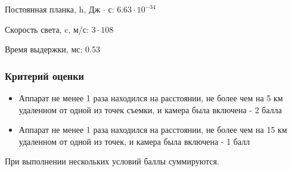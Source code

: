 Постоянная планка, h, Дж $\cdot$ с: $6.63 \cdot 10^{-34}$

Скорость света, c, м/с: $3 \cdot 108$

Время выдержки, мс: 0.53


\subsubsection*{Критерий оценки}

\begin{itemize}
    \item Аппарат не менее 1 раза находился на расстоянии, не более чем на 5 км удаленном от одной из точек съемки, и камера была включена - 2 балла
    \item Аппарат не менее 1 раза находился на расстоянии, не более чем на 15 км удаленном от одной из точек, и камера была включена - 1 балл
\end{itemize}

При выполнении нескольких условий баллы суммируются.
